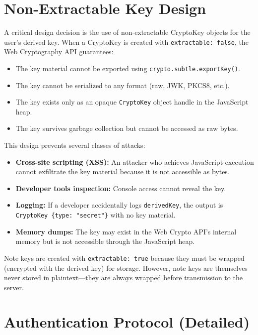 \section{Non-Extractable Key Design}

A critical design decision is the use of non-extractable CryptoKey objects for the user's derived key. When a CryptoKey is created with \texttt{extractable: false}, the Web Cryptography API guarantees:

\begin{itemize}
    \item The key material cannot be exported using \texttt{crypto.subtle.exportKey()}.
    \item The key cannot be serialized to any format (raw, JWK, PKCS8, etc.).
    \item The key exists only as an opaque \texttt{CryptoKey} object handle in the JavaScript heap.
    \item The key survives garbage collection but cannot be accessed as raw bytes.
\end{itemize}

This design prevents several classes of attacks:
\begin{itemize}
    \item \textbf{Cross-site scripting (XSS):} An attacker who achieves JavaScript execution cannot exfiltrate the key material because it is not accessible as bytes.
    \item \textbf{Developer tools inspection:} Console access cannot reveal the key.
    \item \textbf{Logging:} If a developer accidentally logs \texttt{derivedKey}, the output is \texttt{CryptoKey \{type: "secret"\}} with no key material.
    \item \textbf{Memory dumps:} The key may exist in the Web Crypto API's internal memory but is not accessible through the JavaScript heap.
\end{itemize}

Note keys are created with \texttt{extractable: true} because they must be wrapped (encrypted with the derived key) for storage. However, note keys are themselves never stored in plaintext---they are always wrapped before transmission to the server.

\section{Authentication Protocol (Detailed)}

